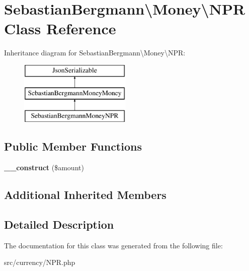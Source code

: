 \hypertarget{classSebastianBergmann_1_1Money_1_1NPR}{}\section{Sebastian\+Bergmann\textbackslash{}Money\textbackslash{}N\+P\+R Class Reference}
\label{classSebastianBergmann_1_1Money_1_1NPR}
Inheritance diagram for Sebastian\+Bergmann\textbackslash{}Money\textbackslash{}N\+P\+R\+:\begin{figure}[H]
\begin{center}
\leavevmode
\includegraphics[height=3.000000cm]{classSebastianBergmann_1_1Money_1_1NPR}
\end{center}
\end{figure}
\subsection*{Public Member Functions}
\begin{DoxyCompactItemize}
\item 
\hypertarget{classSebastianBergmann_1_1Money_1_1NPR_a199d0b48d0179a02f5e91896b6007787}{}{\bfseries \+\_\+\+\_\+construct} (\$amount)\label{classSebastianBergmann_1_1Money_1_1NPR_a199d0b48d0179a02f5e91896b6007787}

\end{DoxyCompactItemize}
\subsection*{Additional Inherited Members}


\subsection{Detailed Description}


The documentation for this class was generated from the following file\+:\begin{DoxyCompactItemize}
\item 
src/currency/N\+P\+R.\+php\end{DoxyCompactItemize}
